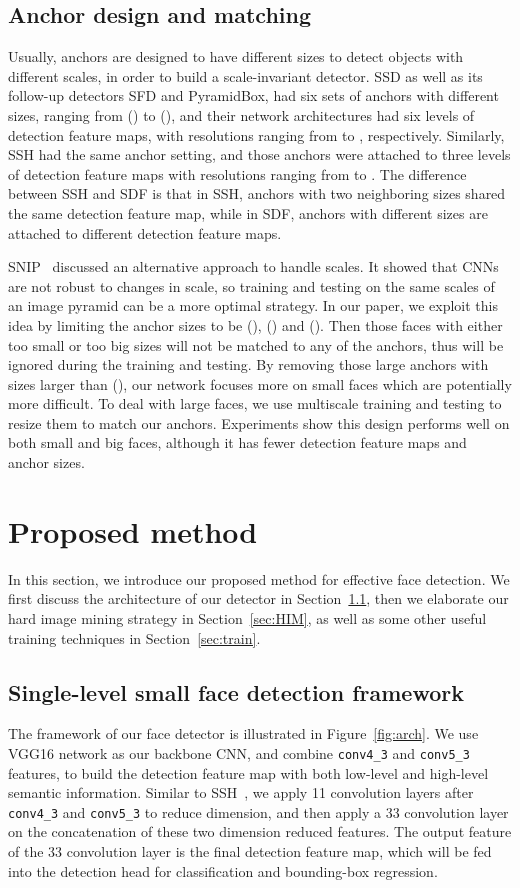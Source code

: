 \documentclass[10pt,twocolumn,letterpaper]{article}
\begin{document}
\subsection{Anchor design and matching}
Usually, anchors are designed to have different sizes to detect objects with different
scales, in order to build a scale-invariant detector. SSD as well as its follow-up detectors SFD and PyramidBox,
had six sets of anchors with different
sizes, ranging from () to (), and their network architectures had six levels
of detection feature maps, with resolutions ranging from  to ,
respectively. Similarly, SSH had the same anchor setting, and those anchors were
attached to three levels of detection
feature maps with resolutions ranging from  to . The difference
between SSH and SDF is that in SSH, anchors with two neighboring sizes shared the same
detection feature map, while in SDF, anchors with different sizes are attached to
different detection feature maps.

SNIP~\cite{Singh2017AnAO} discussed an alternative approach to handle scales. It
showed that CNNs are not robust to changes in scale, so training and testing on the same
scales of an image pyramid can be a more optimal strategy. In our paper, we exploit
this idea by limiting the anchor sizes to be (), () and ().
Then those faces with either too small or too big sizes will not be matched to any of the anchors, thus
will be ignored during the training and testing. By removing those large anchors with sizes larger than
(), our network focuses more on small faces which are potentially more difficult.
To deal with large faces, we use multiscale training
and testing to resize them to match our anchors.
Experiments show this design performs well on both small and big faces, although it
has fewer detection feature maps and anchor sizes.


\section{Proposed method}\label{sec:method}
In this section, we introduce our proposed method for effective face
detection. We first discuss the architecture of our detector in Section~\ref{sec:arch},
then we elaborate our hard image mining strategy in Section~\ref{sec:HIM}, as well as some other useful training techniques in Section~\ref{sec:train}.

\subsection{Single-level small face detection framework}\label{sec:arch}
The framework of our face detector is illustrated in Figure~\ref{fig:arch}. We use
VGG16 network as our backbone CNN, and combine \texttt{conv4\_3} and \texttt{conv5\_3} features,
to build the detection feature map with both low-level
and high-level semantic information. Similar to SSH~\cite{najibi2017ssh}, we apply
11 convolution layers after \texttt{conv4\_3} and \texttt{conv5\_3} to reduce
dimension, and then apply a 33 convolution layer on the
concatenation of these two dimension reduced features. The output feature of the
33 convolution layer is the final detection feature map, which will be fed into
the detection head for classification and bounding-box regression.
\end{document}
